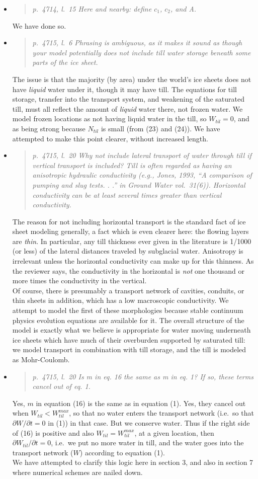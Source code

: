 \documentclass[11pt,reqno]{amsart}
\newcommand{\reply}[2]{
\medskip\medskip
\item  \begin{quote}
\emph{#1}
\end{quote}

\medskip
\noindent #2}
\begin{document}
\begin{itemize}
\reply{p.~4714, l.~15 Here and nearby: define $c_1$, $c_2$, and A.}
{We have done so.}

\reply{p.~4715, l.~6 Phrasing is ambiguous, as it makes it sound as though your model
potentially does not include till water storage beneath some parts of the ice sheet.}
{The issue is that the majority (by area) under the world's ice sheets does not have \emph{liquid} water under it, though it may have till.  The equations for till storage, transfer into the transport system, and weakening of the saturated till, must all reflect the amount of \emph{liquid} water there, not frozen water.  We model frozen locations as not having liquid water in the till, so $W_{til}=0$, and as being strong because $N_{til}$ is small (from (23) and (24)).  We have attempted to make this point clearer, without increased length.}

\reply{p.~4715, l.~20 Why not include lateral transport of water through till if vertical transport is included?  Till is often regarded as having an anisotropic hydraulic conductivity (e.g., Jones, 1993, ``A comparison of pumping and slug tests. . .'' in Ground Water vol.~31(6)).  Horizontal conductivity can be at least several times greater than vertical conductivity.}
{The reason for not including horizontal transport is the standard fact of ice sheet modeling generally, a fact which is even clearer here: the flowing layers are \emph{thin}.  In particular, any till thickness ever given in the literature is 1/1000 (or less) of the lateral distances traveled by subglacial water.  Anisotropy is irrelevant unless the horizontal conductivity can make up for this thinness.  As the reviewer says, the conductivity in the horizontal is \emph{not} one thousand or more times the conductivity in the vertical.\\
\indent Of course, there is presumably a transport network of cavities, conduits, or thin sheets in addition, which has a low macroscopic conductivity.  We attempt to model the first of these morphologies because stable continuum physics evolution equations are available for it.  The overall structure of the model is exactly what we believe is appropriate for water moving underneath ice sheets which have much of their overburden supported by saturated till: we model transport in combination with till storage, and the till is modeled as Mohr-Coulomb.}

\reply{p.~4715, l.~20 Is m in eq. 16 the same as m in eq. 1?  If so, these terms cancel out of
eq. 1.}
{Yes, $m$ in equation (16) is the same as in equation (1).  Yes, they cancel out when $W_{til}< W_{til}^{max}$, so that no water enters the transport network (i.e.~so that $\partial W/\partial t=0$ in (1)) in that case.  But we conserve water.  Thus if the right side of (16) is positive and also $W_{til} = W_{til}^{max}$, at a given location, then $\partial W_{til}/\partial t=0$, i.e.~we put no more water in till, and the water goes into the transport network ($W$) according to equation (1). \\
\indent We have attempted to clarify this logic here in section 3, and also in section 7 where numerical schemes are nailed down.}


\end{itemize}
\end{document}
